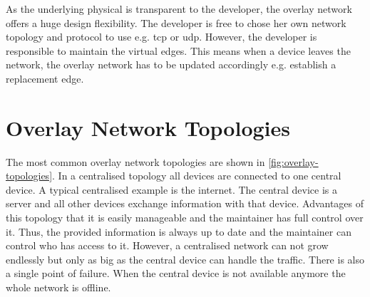 As the underlying physical is transparent to the developer, the overlay network offers a huge design flexibility. The developer is free to chose her own network topology and protocol to use e.g. \gls{tcp} or \gls{udp}. However, the developer is responsible to maintain the virtual edges. This means when a device leaves the network, the overlay network has to be updated accordingly e.g. establish a replacement edge.

\section{Overlay Network Topologies}
The most common overlay network topologies are shown in \cref{fig:overlay-topologies}. In a centralised topology all devices are connected to one central device. A typical centralised example is the internet. The central device is a server and all other devices exchange information with that device. Advantages of this topology that it is easily manageable and the maintainer has full control over it. Thus, the provided information is always up to date and the maintainer can control who has access to it. However, a centralised network can not grow endlessly but only as big as the central device can handle the traffic. There is also a single point of failure. When the central device is not available anymore the whole network is offline.
